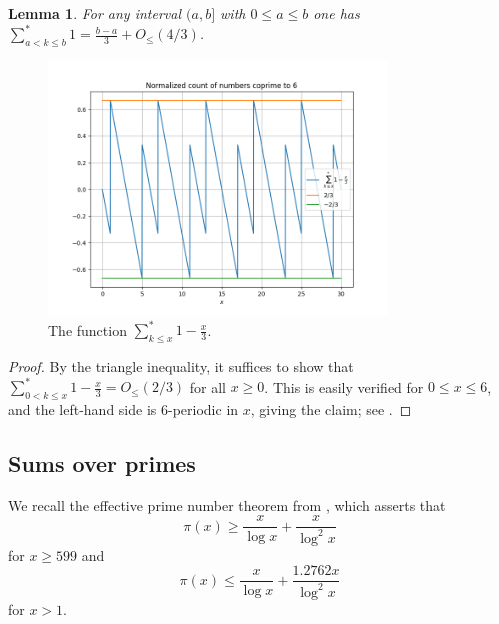 \documentclass[12pt,a4paper,reqno]{amsart}
\numberwithin{equation}{section}
\theoremstyle{plain}
\newtheorem{lemma}[theorem]{Lemma}
\theoremstyle{definition}
\begin{document}
\begin{lemma}\label{lit}  For any interval $(a,b]$ with $0 \leq a \leq b$ one has $\sum_{a < k \leq b}^* 1 = \frac{b-a}{3} + O_{\leq}(4/3)$.
\end{lemma}

\begin{figure}
  \centering
  \includegraphics[width=0.8\textwidth]{sawtooth.png}
  \caption{The function $\sum_{k \leq x}^* 1 - \frac{x}{3}$.}\label{fig-saw}
\end{figure}

\begin{proof}  By the triangle inequality, it suffices to show that $\sum_{0 < k \leq x}^* 1 - \frac{x}{3} = O_{\leq}(2/3)$ for all $x \geq 0$.  This is easily verified for $0 \leq x \leq 6$, and the left-hand side is $6$-periodic in $x$, giving the claim; see .
\end{proof}


\subsection{Sums over primes}

We recall the effective prime number theorem from \cite[Corollary 5.2]{dusart}, which asserts that
\begin{equation}\label{pi-lower}
  \pi(x) \geq \frac{x}{\log x} + \frac{x}{\log^2 x}
\end{equation}
for $x \geq 599$ and
\begin{equation}\label{pi-upper}
  \pi(x) \leq \frac{x}{\log x} + \frac{1.2762 x}{\log^2 x}
\end{equation}
for $x >1$.  
\end{document}
